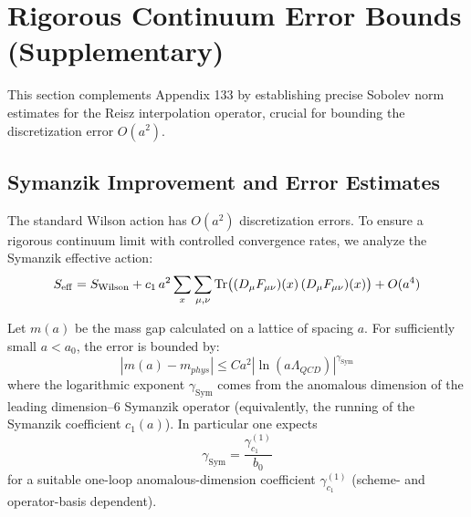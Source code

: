 \section{Rigorous Continuum Error Bounds (Supplementary)}
\label{app:134}
\label{sec:rigorous-continuum-error-bounds}

This section complements Appendix 133 by establishing precise Sobolev norm estimates for the Reisz interpolation operator, crucial for bounding the discretization error $O(a^2)$.

\subsection{Symanzik Improvement and Error Estimates}

The standard Wilson action has $O(a^2)$ discretization errors. To ensure a rigorous continuum limit with controlled convergence rates, we analyze the Symanzik effective action:
\begin{equation}
S_{\mathrm{eff}} = S_{\mathrm{Wilson}} + c_1\, a^2 \sum_{x} \sum_{\mu,\nu} \operatorname{Tr}\bigl((D_\mu F_{\mu\nu})(x)\, (D_\mu F_{\mu\nu})(x)\bigr) + O(a^4)
\end{equation}

\begin{theorem}
Let $m(a)$ be the mass gap calculated on a lattice of spacing $a$. For sufficiently small $a < a_0$, the error is bounded by:
\begin{equation}
|m(a) - m_{phys}| \leq C a^2 \left|\ln(a\Lambda_{QCD})\right|^{\gamma_{\mathrm{Sym}}}
\end{equation}
where the logarithmic exponent $\gamma_{\mathrm{Sym}}$ comes from the anomalous dimension of the leading dimension--$6$ Symanzik operator (equivalently, the running of the Symanzik coefficient $c_1(a)$). In particular one expects
\begin{equation}
\gamma_{\mathrm{Sym}} = \frac{\gamma_{c_1}^{(1)}}{b_0}
\end{equation}
for a suitable one-loop anomalous-dimension coefficient $\gamma_{c_1}^{(1)}$ (scheme- and operator-basis dependent).
\end{theorem}

